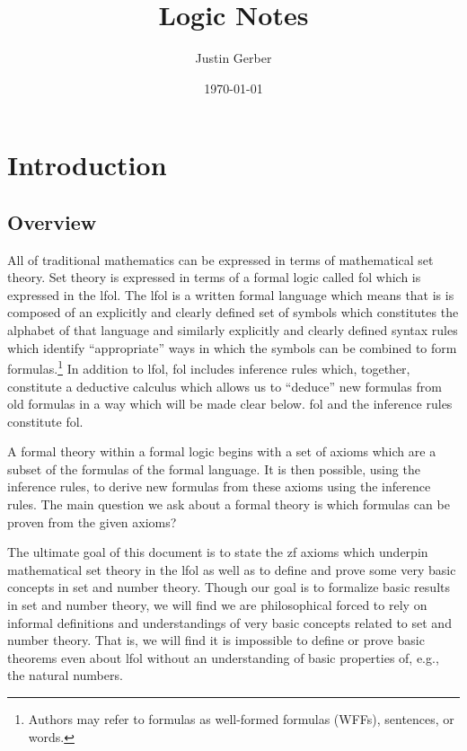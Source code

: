 \documentclass[12pt]{article}
\theoremstyle{break}
\theoremstyle{break}
\theoremstyle{break}
\theoremstyle{break}
\theoremstyle{break}
\newtheorem{informal definition}[definition]{Informal Definition}
\newcommand{\qq}[1]{``#1''}
\begin{document}
\title{Logic Notes}
\author{Justin Gerber}
\date{\today}
\maketitle

\section{Introduction}

\subsection{Overview}

All of traditional mathematics can be expressed in terms of mathematical set theory.
Set theory is expressed in terms of a formal logic called \gls{fol} which is expressed in the \gls{lfol}.
The \gls{lfol} is a written formal language which means that is is composed of an explicitly and clearly defined set of symbols which constitutes the alphabet of that language and similarly explicitly and clearly defined syntax rules which identify \qq{appropriate} ways in which the symbols can be combined to form formulas.\footnote{Authors may refer to formulas as well-formed formulas (WFFs), sentences, or words.}
In addition to \gls{lfol}, \gls{fol} includes inference rules which, together, constitute a deductive calculus which allows us to \qq{deduce} new formulas from old formulas in a way which will be made clear below.
\gls{fol} and the inference rules constitute \gls{fol}.

A formal theory within a formal logic begins with a set of axioms which are a subset of the formulas of the formal language.
It is then possible, using the inference rules, to derive new formulas from these axioms using the inference rules.
The main question we ask about a formal theory is which formulas can be proven from the given axioms?

The ultimate goal of this document is to state the \gls{zf} axioms which underpin mathematical set theory in the \gls{lfol} as well as to define and prove some very basic concepts in set and number theory.
Though our goal is to formalize basic results in set and number theory, we will find we are philosophical forced to rely on informal definitions and understandings of very basic concepts related to set and number theory.
That is, we will find it is impossible to define or prove basic theorems even about \gls{lfol} without an understanding of basic properties of, e.g., the natural numbers.
\end{document}
